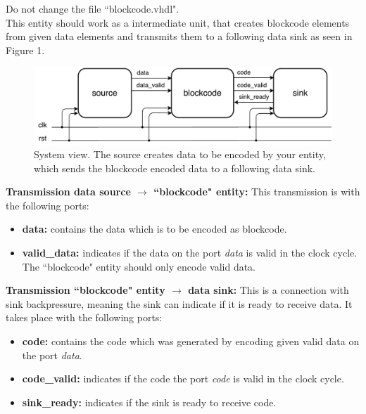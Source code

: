 \documentclass[a4paper,12pt]{article}
\begin{document}
Do not change the file ``blockcode.vhdl".\\

This entity should work as a intermediate unit, that creates blockcode elements from given data elements and transmits 
them to a following data sink as seen in Figure 1.
\\

\begin{figure}[h!]
\centering
\includegraphics[scale=0.6]{../static/system_view.pdf} 
\caption{System view. The source creates data to be encoded by your entity, which sends the blockcode encoded data to
a following data sink.}
\end{figure}

\newpage

\textbf{Transmission data source $\rightarrow$ ``blockcode" entity:} This transmission is with the following ports:
\begin{itemize} 
\item \textbf{data:} contains the data which is to be encoded as blockcode.
\item \textbf{valid\_data:} indicates if the data on the port \textit{data} is valid in the clock cycle.
The ``blockcode" entity should only encode valid data.
\end{itemize}

\textbf{Transmission ``blockcode" entity $\rightarrow$ data sink:} This is a connection with sink backpressure, 
meaning the sink can indicate if it is ready to receive data. It takes place with the following ports:
\begin{itemize} 
\item \textbf{code:} contains the code which was generated by encoding given valid data on the port \textit{data}. 
\item \textbf{code\_valid:} indicates if the code the port \textit{code} is valid in the clock cycle.
\item \textbf{sink\_ready:} indicates if the sink is ready to receive code. 
\end{itemize}
\end{document}
